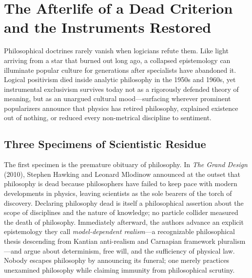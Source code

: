 \section{The Afterlife of a Dead Criterion and the Instruments Restored}

Philosophical doctrines rarely vanish when logicians refute them. Like light arriving from a star that burned out long ago, a collapsed epistemology can illuminate popular culture for generations after specialists have abandoned it. Logical positivism died inside analytic philosophy in the 1950s and 1960s, yet instrumental exclusivism survives today not as a rigorously defended theory of meaning, but as an unargued cultural mood---surfacing wherever prominent popularizers announce that physics has retired philosophy, explained existence out of nothing, or reduced every non-metrical discipline to sentiment.

\subsection{Three Specimens of Scientistic Residue}

The first specimen is the premature obituary of philosophy. In \emph{The Grand Design} (2010), Stephen Hawking and Leonard Mlodinow announced at the outset that philosophy is dead because philosophers have failed to keep pace with modern developments in physics, leaving scientists as the sole bearers of the torch of discovery. Declaring philosophy dead is itself a philosophical assertion about the scope of disciplines and the nature of knowledge; no particle collider measured the death of philosophy. Immediately afterward, the authors advance an explicit epistemology they call \emph{model-dependent realism}---a recognizable philosophical thesis descending from Kantian anti-realism and Carnapian framework pluralism---and argue about determinism, free will, and the sufficiency of physical law. Nobody escapes philosophy by announcing its funeral; one merely practices unexamined philosophy while claiming immunity from philosophical scrutiny.

